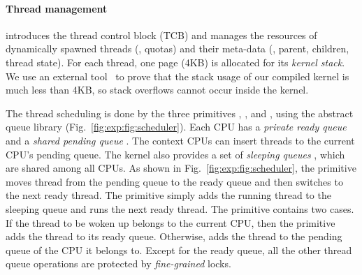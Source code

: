 

\paragraph{Thread management}
introduces the thread control block (TCB)
and manages the resources of dynamically spawned threads (\eg, quotas) and
their meta-data (\eg, parent, children, thread state).
For each thread, one page (4KB) is allocated for its \emph{kernel stack}.
We use an external tool~\cite{veristack}
to prove that the stack usage of our compiled kernel is much
less than 4KB,
so stack overflows cannot occur inside the kernel.

The thread scheduling is done by the three primitives , 
, and , using the abstract queue library
(\cf Fig.~\ref{fig:exp:fig:scheduler}). 
Each CPU has a \emph{private ready queue} 
and a \emph{shared pending queue} .
The context CPUs can insert threads to the current CPU's pending queue.
The {\mCTOS} kernel also provides a set of \emph{sleeping queues} , which are
shared among all CPUs.
As shown in Fig.~\ref{fig:exp:fig:scheduler},
the  primitive moves thread from
the pending queue to the ready queue
and then switches to the next ready thread.
The  primitive simply adds the running thread to the sleeping
queue and runs the next ready thread.
The  primitive contains two cases.
If the thread to be woken up belongs to the current CPU,
then the primitive adds the thread to its ready queue.
Otherwise,  adds the thread to the pending queue of the CPU it belongs to.
Except for the ready queue,
all the other thread queue operations are protected by \emph{fine-grained} locks.

